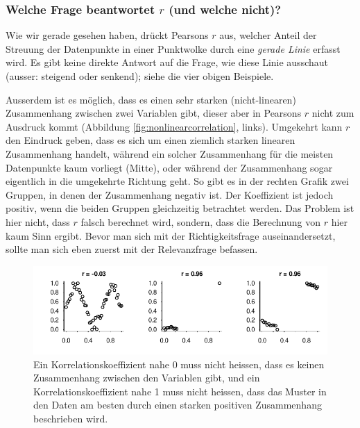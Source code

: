 \documentclass[oneside, 10pt]{book}\usepackage[]{graphicx}\usepackage[]{xcolor}
\newenvironment{knitrout}{}{} %
\begin{document}
\subsubsection{Welche Frage beantwortet $r$ (und welche nicht)?}
Wie wir gerade gesehen haben, drückt Pearsons $r$ aus,
welcher Anteil der Streuung der Datenpunkte in einer Punktwolke durch
eine \emph{gerade Linie} erfasst wird.
Es gibt keine direkte Antwort auf die Frage, wie diese Linie ausschaut
(ausser: steigend oder senkend);
siehe die vier obigen Beispiele.

Ausserdem ist es möglich, dass es einen sehr starken (nicht-linearen) Zusammenhang zwischen zwei Variablen gibt,
dieser aber in Pearsons $r$ nicht zum Ausdruck kommt (Abbildung \ref{fig:nonlinearcorrelation}, links).
Umgekehrt kann $r$ den Eindruck geben, dass es sich um einen ziemlich starken linearen Zusammenhang handelt, während ein solcher Zusammenhang für die meisten Datenpunkte kaum vorliegt (Mitte),
oder während der Zusammenhang sogar eigentlich in die umgekehrte Richtung geht.
So gibt es in der rechten Grafik zwei Gruppen, in denen der Zusammenhang negativ ist.
Der Koeffizient ist jedoch positiv, wenn die beiden Gruppen gleichzeitig betrachtet werden.
Das Problem ist hier nicht, dass $r$ falsch berechnet wird,
sondern, dass die Berechnung von $r$ hier kaum Sinn ergibt.
Bevor man sich mit der Richtigkeitsfrage auseinandersetzt,
sollte man sich eben zuerst mit der Relevanzfrage befassen.

\begin{knitrout}
\color{fgcolor}\begin{figure}[tp]

{\centering \includegraphics[width=.9\textwidth]{figs/unnamed-chunk-183-1} 

}

\caption{Ein Korrelationskoeffizient nahe 0 muss nicht heissen, dass es keinen Zusammenhang zwischen den Variablen gibt, und ein Korrelationskoeffizient nahe 1 muss nicht heissen, dass das Muster in den Daten am besten durch einen starken positiven Zusammenhang beschrieben wird.\label{fig:nonlinearcorrelation}}\label{fig:unnamed-chunk-183}
\end{figure}

\end{knitrout}
\end{document}
